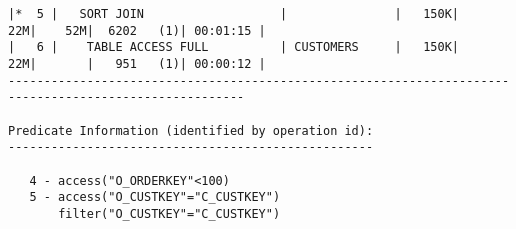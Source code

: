 \documentclass[11pt,a4paper,parskip=half]{scrartcl}
\begin{document}
\begin{lstlisting}
|*  5 |   SORT JOIN                   |               |   150K|    22M|    52M|  6202   (1)| 00:01:15 |                                                                                                                                                                                                      
|   6 |    TABLE ACCESS FULL          | CUSTOMERS     |   150K|    22M|       |   951   (1)| 00:00:12 |                                                                                                                                                                                                      
-------------------------------------------------------------------------------------------------------                                                                                                                                                                                                      
                                                                                                                                                                                                                                                                                                             
Predicate Information (identified by operation id):                                                                                                                                                                                                                                                          
---------------------------------------------------                                                                                                                                                                                                                                                          
                                                                                                                                                                                                                                                                                                             
   4 - access("O_ORDERKEY"<100)                                                                                                                                                                                                                                                                              
   5 - access("O_CUSTKEY"="C_CUSTKEY")                                                                                                                                                                                                                                                                       
       filter("O_CUSTKEY"="C_CUSTKEY")                                                                                                                                                                                                                                                                       
\end{lstlisting}
\end{document}

